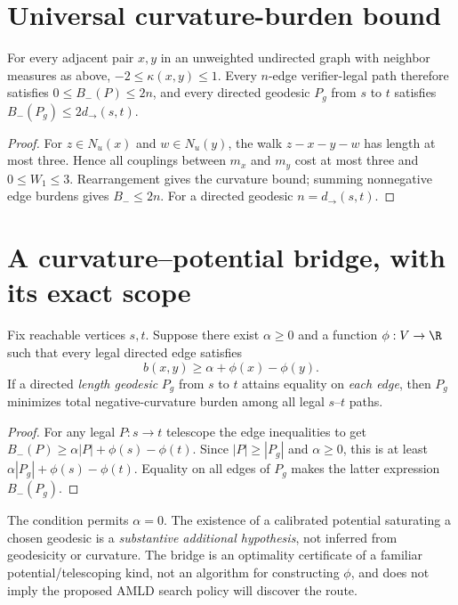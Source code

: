 \section{Universal curvature-burden bound}
\begin{theorem}\label{thm:bound}
For every adjacent pair $x,y$ in an unweighted undirected graph with neighbor measures as above, $-2\le\kappa(x,y)\le1$. Every $n$-edge verifier-legal path therefore satisfies $0\le B_-(P)\le2n$, and every directed geodesic $P_g$ from $s$ to $t$ satisfies $B_-(P_g)\le2d_{\to}(s,t)$.
\end{theorem}
\begin{proof}
For $z\in N_u(x)$ and $w\in N_u(y)$, the walk $z-x-y-w$ has length at most three. Hence all couplings between $m_x$ and $m_y$ cost at most three and $0\le W_1\le3$. Rearrangement gives the curvature bound; summing nonnegative edge burdens gives $B_-\le2n$. For a directed geodesic $n=d_{\to}(s,t)$.
\end{proof}

\section{A curvature--potential bridge, with its exact scope}
\begin{theorem}\label{thm:bridge}
Fix reachable vertices $s,t$. Suppose there exist $\alpha\ge0$ and a function $\phi:V\to\R$ such that every legal directed edge satisfies
\[b(x,y)\ge\alpha+\phi(x)-\phi(y).\]
If a directed \emph{length geodesic} $P_g$ from $s$ to $t$ attains equality on \emph{each edge}, then $P_g$ minimizes total negative-curvature burden among all legal $s$--$t$ paths.
\end{theorem}
\begin{proof}
For any legal $P:s\to t$ telescope the edge inequalities to get $B_-(P)\ge\alpha|P|+\phi(s)-\phi(t)$. Since $|P|\ge |P_g|$ and $\alpha\ge0$, this is at least $\alpha|P_g|+\phi(s)-\phi(t)$. Equality on all edges of $P_g$ makes the latter expression $B_-(P_g)$.
\end{proof}
\begin{remark}
The condition permits $\alpha=0$. The existence of a calibrated potential saturating a chosen geodesic is a \emph{substantive additional hypothesis}, not inferred from geodesicity or curvature. The bridge is an optimality certificate of a familiar potential/telescoping kind, not an algorithm for constructing $\phi$, and does not imply the proposed AMLD search policy will discover the route.
\end{remark}

